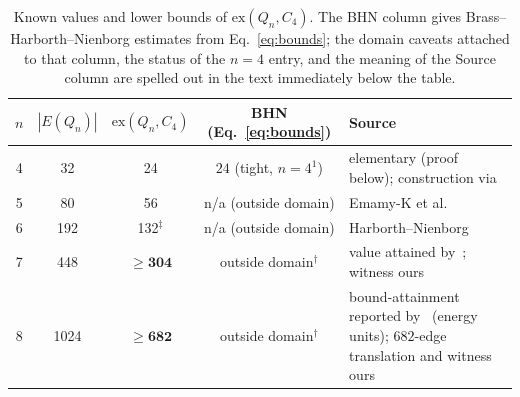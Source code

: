 \documentclass[12pt,a4paper]{article}
\theoremstyle{definition}
\newcommand{\ex}{\mathrm{ex}}
\begin{document}
\begin{table}[ht]
\centering\small
\caption{Known values and lower bounds of $\ex(Q_n,C_4)$. The BHN column
  gives Brass--Harborth--Nienborg estimates from Eq.~\eqref{eq:bounds}; the
  domain caveats attached to that column, the status of the $n=4$ entry,
  and the meaning of the Source column are spelled out in the text
  immediately below the table.}
\label{tab:values}\medskip
\begin{tabular}{@{}ccccp{5.1cm}@{}}
\toprule
$n$ & $|E(Q_n)|$ & $\ex(Q_n,C_4)$ & BHN (Eq.~\ref{eq:bounds}) & Source\\
\midrule
4 &   32 & 24  & $24$ (tight, $n=4^1$) & elementary (proof below); construction via~\cite{BHN95}\\
5 &   80 & 56  & n/a (outside domain) & Emamy-K et al.~\cite{EGR92}\\
6 &  192 & 132$^{\ddagger}$ & n/a (outside domain) & Harborth--Nienborg~\cite{HN94}\\
7 &  448 & $\ge\mathbf{304}$ & outside domain$^{\dagger}$ & value attained by~\cite{DPTV79}; witness ours\\
8 & 1024 & $\ge\mathbf{682}$ & outside domain$^{\dagger}$ & bound-attainment reported by~\cite{MPR95} (energy units); $682$-edge translation and witness ours\\
\bottomrule
\end{tabular}
\end{table}
\end{document}
